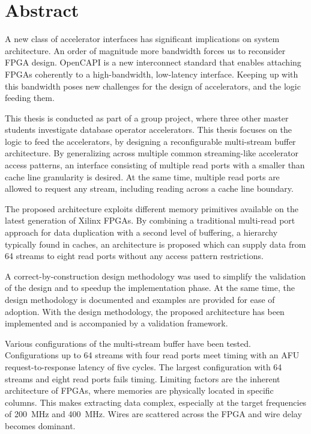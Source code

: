 \chapter*{Abstract}

A new class of accelerator interfaces has significant implications on system architecture. An order of magnitude more bandwidth forces us to reconsider FPGA design. OpenCAPI is a new interconnect standard that enables attaching FPGAs coherently to a high-bandwidth, low-latency interface. Keeping up with this bandwidth poses new challenges for the design of accelerators, and the logic feeding them.

This thesis is conducted as part of a group project, where three other master students investigate database operator accelerators. This thesis focuses on the logic to feed the accelerators, by designing a reconfigurable multi-stream buffer architecture. By generalizing across multiple common streaming-like accelerator access patterns, an interface consisting of multiple read ports with a smaller than cache line granularity is desired. At the same time, multiple read ports are allowed to request any stream, including reading across a cache line boundary.

The proposed architecture exploits different memory primitives available on the latest generation of Xilinx FPGAs. By combining a traditional multi-read port approach for data duplication with a second level of buffering, a hierarchy typically found in caches, an architecture is proposed which can supply data from 64 streams to eight read ports without any access pattern restrictions.

A correct-by-construction design methodology was used to simplify the validation of the design and to speedup the implementation phase. At the same time, the design methodology is documented and examples are provided for ease of adoption. With the design methodology, the proposed architecture has been implemented and is accompanied by a validation framework.

Various configurations of the multi-stream buffer have been tested. Configurations up to 64 streams with four read ports meet timing with an AFU request-to-response latency of five cycles. The largest configuration with 64 streams and eight read ports fails timing. Limiting factors are the inherent architecture of FPGAs, where memories are physically located in specific columns. This makes extracting data complex, especially at the target frequencies of \SI{200}{\mega\hertz} and \SI{400}{\mega\hertz}. Wires are scattered across the FPGA and wire delay becomes dominant.

